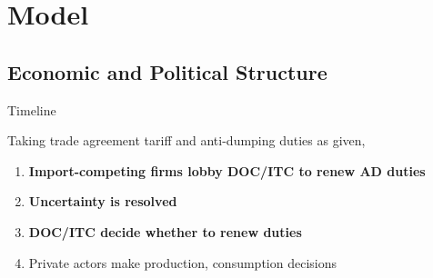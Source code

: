 \documentclass[handout]{beamer}
\begin{document}
\begin{comment}
\subsection{}
\begin{frame}
\frametitle{Related Literature}
\small Protection for Sale: Grossman $\&$ Helpman (1994)
\begin{itemize}
  \item \footnotesize Empirics: Goldberg $\&$ Maggi (1999), Gawande $\&$ Bandyopadhyay (2000), Mitra, Thomakos, $\&$  Ulubasoglu (2002)
  \item \footnotesize Mitra, Thomakos, $\&$  Ulubasoglu (2006), Bombardini (2008)
	\item \footnotesize Trade Wars and Trade Talks: Grossman $\&$ Helpman (1995)
\end{itemize}

\vskip.05in
\small Political economy shocks
\begin{itemize}
	\item \footnotesize Feenstra $\&$ Lewis (1991), Bagwell $\&$ Staiger (2001, 2005)
\end{itemize}

\vskip.05in
\small Separated powers
\begin{itemize}
	\item \footnotesize Mansfield, Milner $\&$ Rosendorff (2000), Song (2008)
\end{itemize}

\vskip.05in
\small Political uncertainty
\begin{itemize}
	\item \footnotesize Milner $\&$ Rosendorff (1997), Le Breton $\&$ Zaporozhets (2007) %
\end{itemize}
	
\end{frame}
\end{comment}

\section{Model}
\subsection{Economic and Political Structure}
\begin{frame}{Timeline}
\pause

Taking trade agreement tariff and anti-dumping duties as given,
\pause
\begin{enumerate}[<+->]
	\item \textbf{Import-competing firms lobby DOC/ITC to renew AD duties}
	\item \textbf{Uncertainty is resolved}
	\item \textbf{DOC/ITC decide whether to renew duties}
	\item Private actors make production, consumption decisions
\end{enumerate}
\end{frame}
\end{document}
